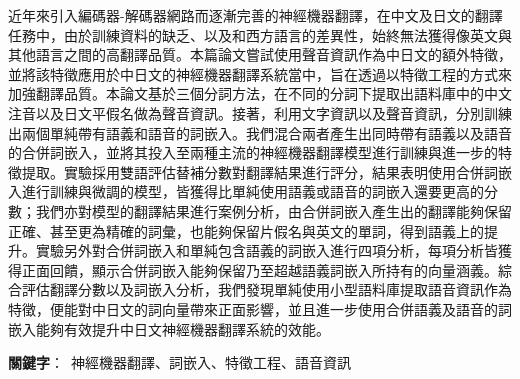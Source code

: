 近年來引入編碼器-解碼器網路而逐漸完善的神經機器翻譯，在中文及日文的翻譯任務中，由於訓練資料的缺乏、以及和西方語言的差異性，始終無法獲得像英文與其他語言之間的高翻譯品質。本篇論文嘗試使用聲音資訊作為中日文的額外特徵，並將該特徵應用於中日文的神經機器翻譯系統當中，旨在透過以特徵工程的方式來加強翻譯品質。本論文基於三個分詞方法，在不同的分詞下提取出語料庫中的中文注音以及日文平假名做為聲音資訊。接著，利用文字資訊以及聲音資訊，分別訓練出兩個單純帶有語義和語音的詞嵌入。我們混合兩者產生出同時帶有語義以及語音的合併詞嵌入，並將其投入至兩種主流的神經機器翻譯模型進行訓練與進一步的特徵提取。實驗採用雙語評估替補分數對翻譯結果進行評分，結果表明使用合併詞嵌入進行訓練與微調的模型，皆獲得比單純使用語義或語音的詞嵌入還要更高的分數；我們亦對模型的翻譯結果進行案例分析，由合併詞嵌入產生出的翻譯能夠保留正確、甚至更為精確的詞彙，也能夠保留片假名與英文的單詞，得到語義上的提升。實驗另外對合併詞嵌入和單純包含語義的詞嵌入進行四項分析，每項分析皆獲得正面回饋，顯示合併詞嵌入能夠保留乃至超越語義詞嵌入所持有的向量涵義。綜合評估翻譯分數以及詞嵌入分析，我們發現單純使用小型語料庫提取語音資訊作為特徵，便能對中日文的詞向量帶來正面影響，並且進一步使用合併語義及語音的詞嵌入能夠有效提升中日文神經機器翻譯系統的效能。

\begin{flushleft}
\mbox{{\bf 關鍵字}： 神經機器翻譯、詞嵌入、特徵工程、語音資訊}
\end{flushleft}